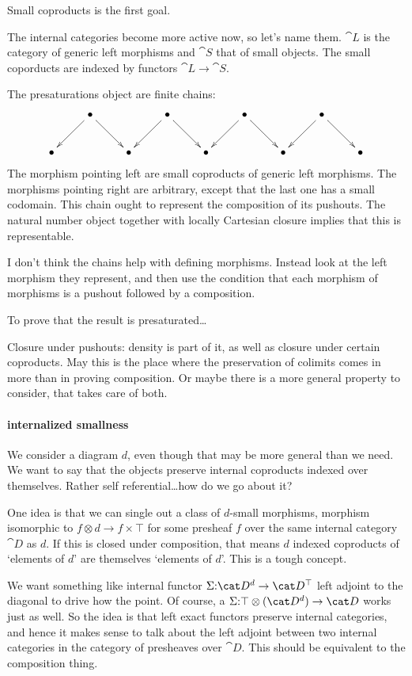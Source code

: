\documentclass[csh.tex]{subfiles}
\begin{document}
Small coproducts is the first goal. 

The internal categories become more active now, so let's name them. $\cat L$ is the category of generic left morphisms and $\cat S$ that of small objects. The small coporducts are indexed by functors $\cat L\to\cat S$.

The presaturations object are finite chains:
\[\xymatrix{
&\bullet \ar[dr]\ar[dl]&&\bullet\ar[dr]\ar[dl] &&\bullet\ar[dr]\ar[dl] &&\bullet\ar[dr]\ar[dl] &\\
\bullet &&\bullet &&\bullet &&\bullet &&\bullet
}\]
The morphism pointing left are small coproducts of generic left morphisms. The morphisms pointing right are arbitrary, except that the last one has a small codomain. This chain ought to represent the composition of its pushouts. The natural number object together with locally Cartesian closure implies that this is representable.

I don't think the chains help with defining morphisms. Instead look at the left morphism they represent, and then use the condition that each morphism of morphisms is a pushout followed by a composition.

To prove that the result is presaturated\dots

Closure under pushouts: density is part of it, as well as closure under certain coproducts. May this is the place where the preservation of colimits comes in more than in proving composition. Or maybe there is a more general property to consider, that takes care of both.

\paragraph{internalized smallness}
We consider a diagram $d$, even though that may be more general than we need. We want to say that the objects preserve internal coproducts indexed over themselves. Rather self referential\dots how do we go about it?

One idea is that we can single out a class of $d$-small morphisms, morphism isomorphic to $f\otimes d\to f\times \top$ for some presheaf $f$ over the same internal category $\cat D$ as $d$. If this is closed under composition, that means $d$ indexed coproducts of `elements of $d$' are themselves `elements of $d$'. This is a tough concept.

We want something like internal functor $\Sigma\of \cat D^d \to \cat D^\top$ left adjoint to the diagonal to drive how the point. Of course, a $\Sigma\of \top\otimes(\cat D^d) \to \cat D$ works just as well. 
So the idea is that left exact functors preserve internal categories, and hence it makes sense to talk about the left adjoint between two internal categories in the category of presheaves over $\cat D$. This should be equivalent to the composition thing.
\end{document}
